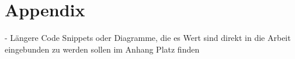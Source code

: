 \chapter{Appendix} %
\label{cha:appendix}

- Längere Code Snippets oder Diagramme, die es Wert sind direkt in die Arbeit eingebunden zu werden sollen im Anhang Platz finden

